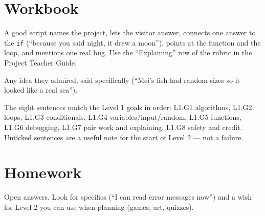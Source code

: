 
\section{Workbook}
\begin{answer}
A good script names the project, lets the visitor answer, connects one answer to the \texttt{if} (\enquote{because you said night, it drew a moon}), points at the function and the loop, and mentions one real bug. Use the \enquote{Explaining} row of the rubric in the Project Teacher Guide.
\end{answer}

\begin{answer}
Any idea they admired, said specifically (\enquote{Mei's fish had random sizes so it looked like a real sea}).
\end{answer}

\begin{answer}
The eight sentences match the Level 1 goals in order: L1.G1 algorithms, L1.G2 loops, L1.G3 conditionals, L1.G4 variables/input/random, L1.G5 functions, L1.G6 debugging, L1.G7 pair work and explaining, L1.G8 safety and credit. Unticked sentences are a useful note for the start of Level 2 --- not a failure.
\end{answer}

\section{Homework}
\begin{answer}
Open answers. Look for specifics (\enquote{I can read error messages now}) and a wish for Level 2 you can use when planning (games, art, quizzes).
\end{answer}

